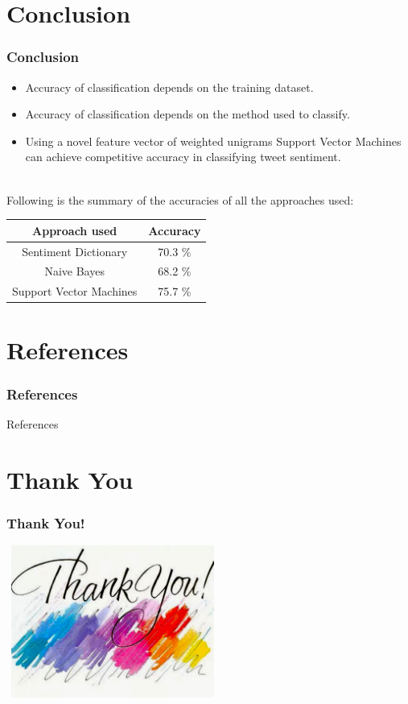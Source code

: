 \documentclass[12pt,xcolor=dvipsnames,table,titlepage]{beamer}
\begin{document}
\section{Conclusion}
\begin{frame}
\frametitle{Conclusion}
\begin{itemize}
\item Accuracy of classification depends on the training dataset.
\item Accuracy of classification depends on the method used to classify.
\item Using a novel feature vector of weighted unigrams Support Vector Machines can achieve competitive accuracy in classifying tweet sentiment.
\end{itemize}
\\Following is the summary of the accuracies of all the approaches used:
\begin{table}[h]
\begin{tabular}{|c|c|}
\hline
\textbf{Approach used}  & \textbf{Accuracy} \\ \hline
Sentiment Dictionary    & 70.3 \%          \\ \hline
Naive Bayes             & 68.2 \%          \\ \hline
Support Vector Machines & 75.7 \%           \\ \hline
\end{tabular}
\end{table}
\end{frame}

\section{References}
\frametitle{References}
\begin{frame}[allowframebreaks]{References}


\end{frame}

\section*{Thank You}
\begin{frame}[t]
\frametitle{Thank You!}
\begin{center}
\includegraphics[width=7cm, height=5cm]{images/thankyou} 
\end{center}
\end{frame}
\end{document}

